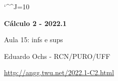 \documentclass[oneside,12pt]{article}
\begin{document}
\catcode`\^^J=10
\pu
\def\pictgridstyle{\color{GrayPale}\linethickness{0.3pt}}
\def\pictaxesstyle{\linethickness{0.5pt}}
\celllower=2.5pt


\def\u#1{\par{\footnotesize \url{#1}}}

\def\Rext{\overline{\R}}

\celllower=2.5pt

\def\Em#1#2{\underbrace{\mathstrut #2}_{\text{em }#1}}
\def\Emx #1{\underbrace{\mathstrut #1}_{\text{em }x}}
\def\Emy #1{\underbrace{\mathstrut #1}_{\text{em }y}}
\def\Emxy#1{\underbrace{\mathstrut #1}_{\text{em }\R^2}}

\def\Intover     #1#2{\overline {∫}_{#1}#2\,dx}
\def\Intunder    #1#2{\underline{∫}_{#1}#2\,dx}
\def\Intoverunder#1#2{\Intover{#1}{#2} - \Intunder{#1}{#2}}

\def\Intxover     #1#2#3{\overline {∫}_{x=#1}^{x=#2}#3\,dx}
\def\Intxunder    #1#2#3{\underline{∫}_{x=#1}^{x=#2}#3\,dx}

\def\Intoverunder   #1#2{\overline{\underline{∫}}_{#1}      #2\,dx}
\def\Intxoverunder#1#2#3{\overline{\underline{∫}}_{x=#1}^{x=#2} #3\,dx}

\def\sumiN#1{\sum_{i=1}^N #1 (b_i-a_i)}
\def\mname#1{\text{[#1]}}

\def\drafturl{http://angg.twu.net/LATEX/2022-1-C2.pdf}
\def\drafturl{http://angg.twu.net/2022.1-C2.html}
\def\draftfooter{\tiny \href{\drafturl}{\jobname{}} \ColorBrown{\shorttoday{} \hours}}



%

\thispagestyle{empty}

\begin{center}

\vspace*{1.2cm}

{\bf \Large Cálculo 2 - 2022.1}

\bsk

Aula 15: infs e sups

\bsk

Eduardo Ochs - RCN/PURO/UFF

\url{http://angg.twu.net/2022.1-C2.html}

\end{center}
\end{document}
